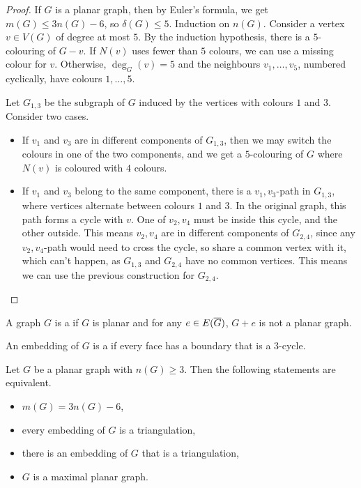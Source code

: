 \begin{proof}
  If $G$ is a planar graph, then by Euler's formula, we get $m(G) \le 3n(G) -
  6$, so $\delta(G) \le 5$.
  Induction on $n(G)$.
  Consider a vertex $v \in V(G)$ of degree at most $5$.
  By the induction hypothesis, there is a $5$-colouring of $G-v$.
  If $N(v)$ uses fewer than $5$ colours, we can use a missing colour for $v$.
  Otherwise, $\deg_G(v) = 5$ and the neighbours $v_1, \ldots, v_5$, numbered
  cyclically, have colours $1, \ldots, 5$.

  Let $G_{1,3}$ be the subgraph of $G$ induced by the vertices with colours $1$
  and $3$.
  Consider two cases.
  \begin{itemize}
  \item If $v_1$ and $v_3$ are in different components of $G_{1,3}$, then we may
	switch the colours in one of the two components, and we get a $5$-colouring
	of $G$ where $N(v)$ is coloured with $4$ colours.
  \item If $v_1$ and $v_3$ belong to the same component, there is a
	$v_1,v_3$-path in $G_{1,3}$, where vertices alternate between colours $1$
	and $3$.
	In the original graph, this path forms a cycle with $v$.
	One of $v_2, v_4$ must be inside this cycle, and the other outside.
	This means $v_2, v_4$ are in different components of $G_{2,4}$, since any
	$v_2,v_4$-path would need to cross the cycle, so share a common vertex with
	it, which can't happen, as $G_{1,3}$ and $G_{2,4}$ have no common vertices.
	This means we can use the previous construction for $G_{2,4}$.
	\qedhere
  \end{itemize}
\end{proof}

\begin{definition}
  A graph $G$ is a  if $G$ is planar and for any $e
  \in E(\overline{G})$, $G+e$ is not a planar graph.
\end{definition}

\begin{definition}
  An embedding of $G$ is a  if every face has a boundary
  that is a $3$-cycle.
\end{definition}

\begin{proposition}
  Let $G$ be a planar graph with $n(G) \ge 3$.
  Then the following statements are equivalent.
  \begin{itemize}
  \item $m(G) = 3n(G) - 6$,
  \item every embedding of $G$ is a triangulation,
  \item there is an embedding of $G$ that is a triangulation,
  \item $G$ is a maximal planar graph.
  \end{itemize}
\end{proposition}

